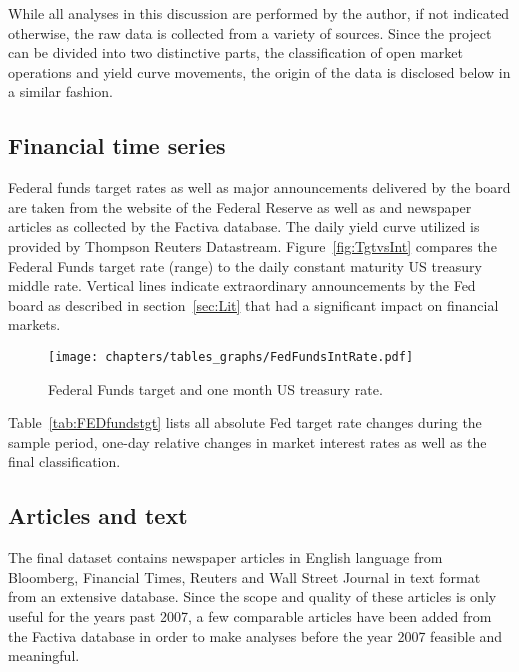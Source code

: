 
While all analyses in this discussion are performed by the author, if not indicated otherwise, the raw data is collected from a variety of sources. Since the project can be divided into two distinctive parts, the classification of open market operations and yield curve movements, the origin of the data is disclosed below in a similar fashion.

\subsection{Financial time series}
Federal funds target rates as well as major announcements delivered by the board are taken from the website of the Federal Reserve \cite{Fed.OMOs} as well as \textcite{Fawley.2013} and newspaper articles as collected by the Factiva database. The daily yield curve utilized is provided by Thompson Reuters Datastream. Figure~\vref{fig:TgtvsInt} compares the Federal Funds target rate (range) to the daily constant maturity US treasury middle rate. Vertical lines indicate extraordinary announcements by the Fed board as described in section~\ref{sec:Lit} that had a significant impact on financial markets.
\begin{figure}[htbp]
	\centering
		\texttt{[image: chapters/tables\_graphs/FedFundsIntRate.pdf]} 
	\caption{Federal Funds target and one month US treasury rate.}
\label{fig:TgtvsInt}
\end{figure}
%

Table~\vref{tab:FEDfundstgt} lists all absolute Fed target rate changes during the sample period, one-day relative changes in market interest rates as well as the final classification.
%

%

\subsection{Articles and text}
The final dataset contains newspaper articles in English language from Bloomberg, Financial Times, Reuters and Wall Street Journal in text format from an extensive database. Since the scope and quality of these articles is only useful for the years past 2007, a few comparable articles have been added from the Factiva database in order to make analyses before the year 2007 feasible and meaningful. 
